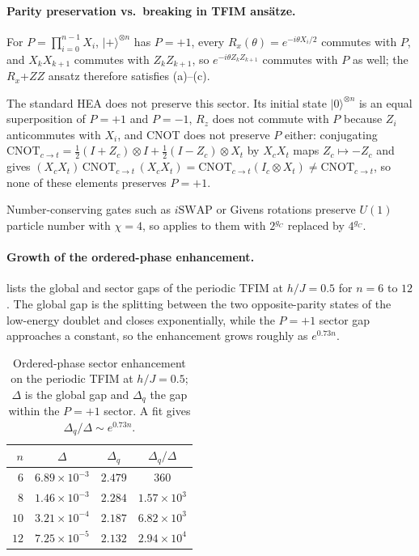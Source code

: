 \documentclass[reprint,aps,pra,floatfix,superscriptaddress,nofootinbib,longbibliography]{revtex4-2}
\theoremstyle{remark}
\theoremstyle{definition}
\newcommand{\ket}[1]{\lvert #1 \rangle}
\begin{document}
\paragraph{Parity preservation vs.\ breaking in TFIM ans\"atze.}
For $P=\prod_{i=0}^{n-1}X_i$, $\ket{+}^{\otimes n}$ has $P=+1$, every
$R_x(\theta)=e^{-i\theta X_i/2}$ commutes with $P$, and $X_k X_{k+1}$ commutes
with $Z_k Z_{k+1}$, so $e^{-i\theta Z_k Z_{k+1}}$ commutes with $P$ as well; the
$R_x$+$ZZ$ ansatz therefore satisfies (a)--(c).

The standard HEA does not preserve this sector. Its initial state
$\ket{0}^{\otimes n}$ is an equal superposition of $P=+1$ and $P=-1$, $R_z$ does
not commute with $P$ because $Z_i$ anticommutes with $X_i$, and CNOT does not
preserve $P$ either: conjugating $\mathrm{CNOT}_{c\to t}=\tfrac12(I+Z_c)\otimes I+\tfrac12(I-Z_c)\otimes X_t$
by $X_c X_t$ maps $Z_c\mapsto -Z_c$ and gives
$(X_c X_t)\,\mathrm{CNOT}_{c\to t}\,(X_c X_t)=\mathrm{CNOT}_{c\to t}(I_c\otimes X_t)\neq\mathrm{CNOT}_{c\to t}$,
so none of these elements preserves $P=+1$.

Number-conserving gates such as $i\mathrm{SWAP}$ or Givens rotations preserve
$U(1)$ particle number with $\chi=4$, so  applies to them with
$2^{g_C}$ replaced by $4^{g_C}$.

\paragraph{Growth of the ordered-phase enhancement.}
 lists the global and sector gaps of the periodic TFIM at
$h/J=0.5$ for $n=6$ to $12$. The global gap is the splitting between the two
opposite-parity states of the low-energy doublet and closes exponentially, while
the $P=+1$ sector gap approaches a constant, so the enhancement grows roughly as
$e^{0.73n}$.

\begin{table}[h]
\centering
\caption{Ordered-phase sector enhancement on the periodic TFIM at $h/J=0.5$;
$\Delta$ is the global gap and $\Delta_q$ the gap within the $P=+1$ sector. A fit
gives $\Delta_q/\Delta\sim e^{0.73n}$.}
\label{tab:sectorscaling}
{\small\setlength{\tabcolsep}{6pt}
\begin{tabular}{rccc}
\toprule
$n$ & $\Delta$ & $\Delta_q$ & $\Delta_q/\Delta$\\
\midrule
$6$  & $6.89\times10^{-3}$ & $2.479$ & $360$\\
$8$  & $1.46\times10^{-3}$ & $2.284$ & $1.57\times10^{3}$\\
$10$ & $3.21\times10^{-4}$ & $2.187$ & $6.82\times10^{3}$\\
$12$ & $7.25\times10^{-5}$ & $2.132$ & $2.94\times10^{4}$\\
\bottomrule
\end{tabular}}
\end{table}
\end{document}
